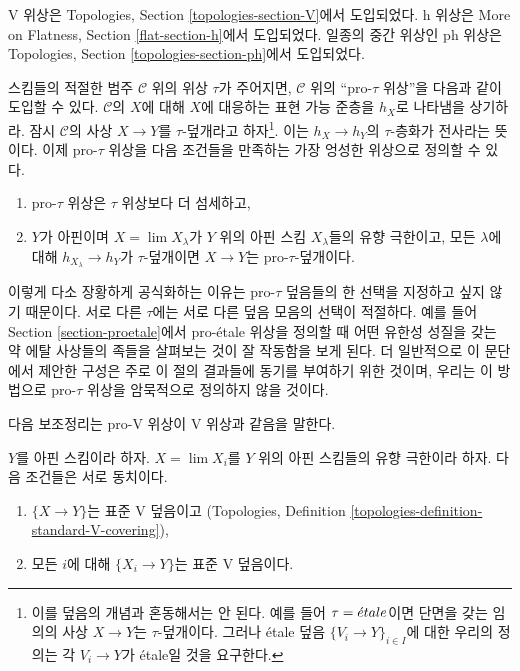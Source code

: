 \noindent
V 위상은 Topologies, Section \ref{topologies-section-V}에서 도입되었다.
h 위상은 More on Flatness, Section \ref{flat-section-h}에서 도입되었다.
일종의 중간 위상인 ph 위상은 Topologies, Section
\ref{topologies-section-ph}에서 도입되었다.

\medskip\noindent
스킴들의 적절한 범주 $\mathcal{C}$ 위의 위상 $\tau$가 주어지면,
$\mathcal{C}$ 위의 ``pro-$\tau$ 위상''을 다음과 같이 도입할 수 있다.
$\mathcal{C}$의 $X$에 대해 $X$에 대응하는 표현 가능 준층을
$h_X$로 나타냄을 상기하라. 잠시 $\mathcal{C}$의 사상 $X \to Y$를
$\tau$-덮개라고 하자\footnote{이를 덮음의 개념과 혼동해서는 안 된다.
예를 들어 $\tau = {\acute{e}tale}$이면 단면을 갖는 임의의 사상 $X \to Y$는
$\tau$-덮개이다. 그러나 \'etale 덮음
$\{V_i \to Y\}_{i \in I}$에 대한 우리의 정의는 각 $V_i \to Y$가
\'etale일 것을 요구한다.}. 이는 $h_X \to h_Y$의 $\tau$-층화가
전사라는 뜻이다. 이제 pro-$\tau$ 위상을 다음 조건들을 만족하는
가장 엉성한 위상으로 정의할 수 있다.
\begin{enumerate}
\item pro-$\tau$ 위상은 $\tau$ 위상보다 더 섬세하고,
\item $Y$가 아핀이며 $X = \lim X_\lambda$가 $Y$ 위의 아핀 스킴
$X_\lambda$들의 유향 극한이고, 모든 $\lambda$에 대해
$h_{X_\lambda} \to h_Y$가 $\tau$-덮개이면
$X \to Y$는 pro-$\tau$-덮개이다.
\end{enumerate}
이렇게 다소 장황하게 공식화하는 이유는 pro-$\tau$ 덮음들의 한 선택을
지정하고 싶지 않기 때문이다. 서로 다른 $\tau$에는 서로 다른 덮음 모음의
선택이 적절하다. 예를 들어 Section \ref{section-proetale}에서
pro-\'etale 위상을 정의할 때 어떤 유한성 성질을 갖는 약 에탈 사상들의
족들을 살펴보는 것이 잘 작동함을 보게 된다. 더 일반적으로 이 문단에서
제안한 구성은 주로 이 절의 결과들에 동기를 부여하기 위한 것이며,
우리는 이 방법으로 pro-$\tau$ 위상을 암묵적으로 정의하지 않을 것이다.

\medskip\noindent
다음 보조정리는 pro-V 위상이 V 위상과 같음을 말한다.

\begin{lemma}
\label{lemma-pro-V-V}
$Y$를 아핀 스킴이라 하자. $X = \lim X_i$를 $Y$ 위의 아핀 스킴들의
유향 극한이라 하자. 다음 조건들은 서로 동치이다.
\begin{enumerate}
\item $\{X \to Y\}$는 표준 V 덮음이고
(Topologies, Definition \ref{topologies-definition-standard-V-covering}),
\item 모든 $i$에 대해 $\{X_i \to Y\}$는 표준 V 덮음이다.
\end{enumerate}
\end{lemma}

